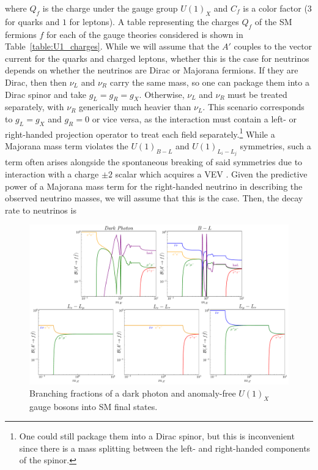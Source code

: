 where $Q_f$ is the charge under the gauge group $U(1)_X$ and $C_f$ is a color factor ($3$ for quarks and $1$ for leptons). A table representing the charges $Q_f$ of the SM fermions $f$ for each of the gauge theories considered is shown in Table~\ref{table:U1_charges}. While we will assume that the $A'$ couples to the vector current for the quarks and charged leptons, whether this is the case for neutrinos depends on whether the neutrinos are Dirac or Majorana fermions. If they are Dirac, then then $\nu_L$ and $\nu_R$ carry the same mass, so one can package them into a Dirac spinor and take $g_L = g_R = g_X$. Otherwise, $\nu_L$ and $\nu_R$ must be treated separately, with $\nu_R$ generically much heavier than $\nu_L$. This scenario corresponds to $g_L = g_X$ and $g_R = 0$ or vice versa, as the interaction must contain a left- or right-handed projection operator to treat each field separately.\footnote{One could still package them into a Dirac spinor, but this is inconvenient since there is a mass splitting between the left- and right-handed components of the spinor.} While a Majorana mass term violates the $U(1)_{B-L}$ and $U(1)_{L_i - L_j}$ symmetries, such a term often arises alongside the spontaneous breaking of said symmetries due to interaction with a charge $\pm2$ scalar which acquires a VEV \cite{Mohapatra:1980qe}. Given the predictive power of a Majorana mass term for the right-handed neutrino in describing the observed neutrino masses, we will assume that this is the case. Then, the decay rate to neutrinos is
\begin{figure}[t!]
    \centering
    \includegraphics[width=\linewidth]{figures/chapter6/gauge_boson_branching_fractions.pdf}
    \caption{Branching fractions of a dark photon and anomaly-free $U(1)_X$ gauge bosons into SM final states.}
    \label{fig:gauge_boson_branching_fractions}
\end{figure}

